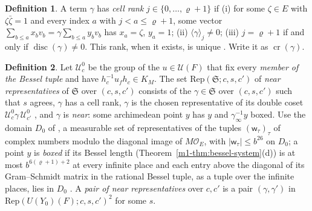 \documentclass[reqno]{amsart}
\theoremstyle{definition}
\newtheorem{definition}{Definition}[section]
\theoremstyle{plain}
\theoremstyle{remark}
\newcommand{\Oc}{\mathcal O}
\newcommand{\Uc}{{\mathcal{U}}}
\newcommand{\Sf}{\mathfrak S}
\newcommand{\disc}{\operatorname{disc}}
\newcommand{\cri}{\operatorname{cr}}
\newcommand{\Rep}{\mathrm{Rep}}
\begin{document}
\begin{definition}\label{def:cell}
A term \(\gamma\) has \emph{cell rank} \(j\in\{0,\dots,\varrho+1\}\) if (i) for some \(\zeta\in E\) with \(\zeta\bar\zeta=1\) and every index \(a\) with \(j<a\le\varrho+1\), some vector \(\sum_{b\le a}x_bv_b=\gamma\sum_{b\le a}y_bv_b\) has \(x_a=\zeta\), \(y_a=1\); (ii) \(\langle\gamma\rangle_j\ne0\); (iii) \(j=\varrho+1\) if and only if \(\disc(\gamma)\ne0\).  This rank, when it exists, is unique \cite[\texttt{BorderedDeterminant.lean}, l.~550]{GL}.  Write it as \(\cri(\gamma)\).
\end{definition}

\begin{definition}\label{def:near}
Let \(\Uc^0_c\) be the group of the \(u\in\Uc(F)\) that fix every \emph{member of the Bessel tuple} and have \(h_c^{-1}u_fh_c\in K_M\).  The set \(\Rep(\Sf;c,s,c')\) of \emph{near representatives} of \(\Sf\) over \((c,s,c')\) consists of the \(\gamma\in\Sf\) over \((c,s,c')\) such that \(s\) agrees, \(\gamma\) has a cell rank, \(\gamma\) is the chosen representative of its double coset \(\Uc^0_c\gamma\,\Uc^0_{c'}\) \cite[\texttt{BorderedDeterminant.lean}, l.~455]{GL}, and \(\gamma\) is \emph{near}: some archimedean point \(y\) has \(y\) and \(\gamma_\infty^{-1}y\) boxed.  Use the domain \(D_0\) of \cite[\texttt{Box.lean}, ll.~145, 200]{GL}, a measurable set of representatives of the tuples \((\mathsf w_\tau)_\tau\) of complex numbers modulo the diagonal image of \(M\Oc_E\), with \(\lvert\mathsf w_\tau\rvert\le b^{26}\) on \(D_0\); a point \(y\) is \emph{boxed} if its Bessel length (Theorem~\ref{m1-thm:bessel-system}(d)) is at most \(b^{6(\varrho+1)+2}\) at every infinite place and each entry above the diagonal of its Gram--Schmidt matrix in the rational Bessel tuple, as a tuple over the infinite places, lies in \(D_0\) \cite[\texttt{Setup.lean}, ll.~398--423]{GL}.  A \emph{pair of near representatives} over \(c,c'\) is a pair \((\gamma,\gamma')\) in \(\Rep(U(Y_0)(F);c,s,c')^2\) for some \(s\).
\end{definition}
\end{document}
